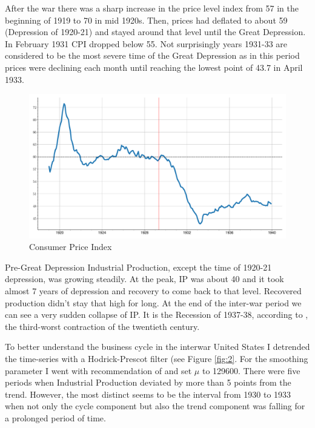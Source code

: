 \documentclass[a4paper,12pt]{article}
\begin{document}
After the war there was a sharp increase in the price level index from 57 in the beginning of 1919 to 70 in mid 1920s. Then, prices had deflated to about 59 (Depression of 1920-21) and stayed around that level until the Great Depression. In February 1931 CPI dropped below 55. Not surprisingly years 1931-33 are considered to be the most severe time of the Great Depression as in this period prices were declining each month until reaching the lowest point of 43.7 in April 1933.

\begin{figure}[H]
    \centering
\caption{Consumer Price Index}
\label{fig:1}
    \includegraphics[width=\textwidth]{../output/figures/ts_CPI.pdf} 
\end{figure}

Pre-Great Depression Industrial Production, except the time of 1920-21 depression, was growing steadily. At the peak, IP was about 40 and it took almost 7 years of depression and recovery to come back to that level. Recovered production didn't stay that high for long. At the end of the inter-war period we can see a very sudden collapse of IP. It is the Recession of 1937-38, according to \cite{bordo2012}, the third-worst contraction of the twentieth century. 

To better understand the business cycle in the interwar United States I detrended the time-series with a Hodrick-Prescot filter (see Figure \ref{fig:2}. For the smoothing parameter I went with recommendation of \cite{morten1997} and set \(\mu\) to 129600. There were five periods when Industrial Production deviated by more than 5 points from the trend. However, the most distinct seems to be the interval from 1930 to 1933 when not only the cycle component but also the trend component was falling for a prolonged period of time. 

\pagebreak
\end{document}
